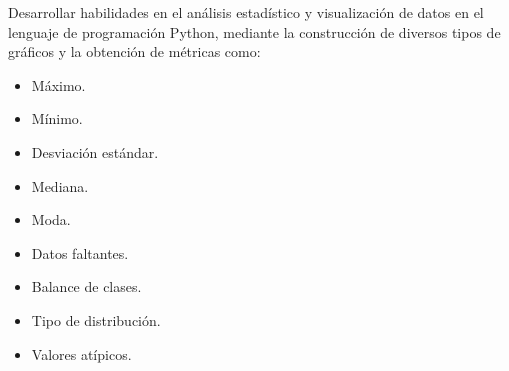 Desarrollar habilidades en el análisis estadístico y visualización de datos en el lenguaje de programación Python, mediante la construcción de diversos tipos de gráficos y la obtención de métricas como:

\begin{itemize}
	\item Máximo.
	\item Mínimo.
	\item Desviación estándar.
	\item Mediana.
	\item Moda.
	\item Datos faltantes.
	\item Balance de clases.
	\item Tipo de distribución.
	\item Valores atípicos.
\end{itemize}
